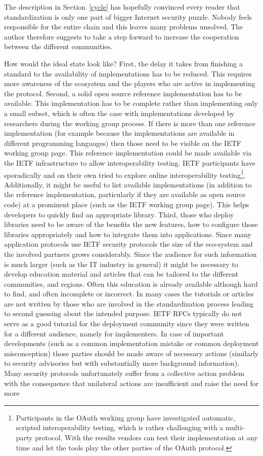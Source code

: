 \documentclass[peerreview, a4paper, 7pt]{IEEEtran}
\begin{document}
The description in Section~\ref{cycle} has hopefully convinced every reader that standardization is only one part of bigger Internet security puzzle. Nobody feels responsible for the entire chain and this leaves many problems unsolved. The author therefore suggests to take a step forward to increase the cooperation between the different communities. 

How would the ideal state look like? First, the delay it takes from finishing a standard to the availability of implementations has to be reduced. This requires more awareness of the ecosystem and the players who are active in implementing the protocol. Second, a solid open source reference implementation has to be available. This implementation has to be complete rather than implementing only a small subset, which is often the case with implementations developed by researchers during the working group process. If there is more than one reference implementation (for example because the implementations are available in different programming languages) then those need to be visible on the IETF working group page. This reference implementation could be made available via the IETF infrastructure to allow interoperability testing. IETF participants have sporadically and on their own tried to explore online interoperability testing\footnote{Participants in the OAuth working group have investigated automatic, scripted interoperability testing, which is rather challenging with a multi-party protocol. With the results vendors can test their implementation at any time and let the tools play the other parties of the OAuth protocol.}. Additionally, it might be useful to list available implementations (in addition to the reference implementation, particularly if they are available as open source code) at a prominent place (such as the IETF working group page). This helps developers to quickly find an appropriate library. Third, those who deploy libraries need to be aware of the benefits the new features, how to configure those libraries appropriately and how to integrate them into applications. Since many application protocols use IETF security protocols the size of the eco-system and the involved partners grows considerably. Since the audience for such information is much larger (such as the IT industry in general) it might be necessary to develop education material and articles that can be tailored to the different communities, and regions. Often this education is already available although hard to find, and often incomplete or incorrect. In many cases the tutorials or articles are not written by those who are involved in the standardization process leading to second guessing about the intended purpose. IETF RFCs typically do not serve as a good tutorial for the deployment community since they were written for a different audience, namely for implementers. In case of important developments (such as a common implementation mistake or common deployment misconception) those parties should be made aware of necessary actions (similarly to security advisories but with substantially more background information). Many security protocols unfortunately suffer from a collective action problem with the consequence that unilateral actions are insufficient and raise the need for more 
\end{document}
